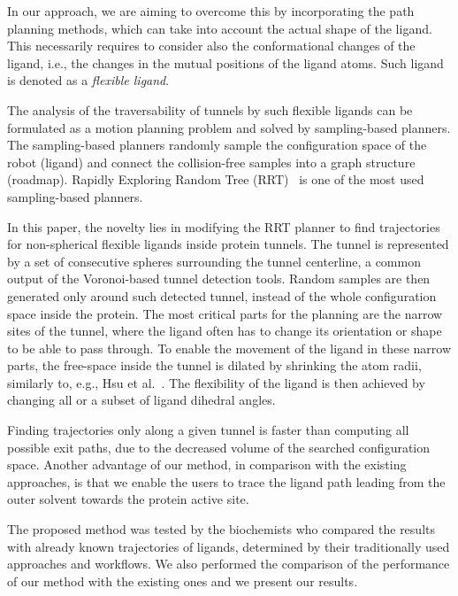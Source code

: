 \documentclass{bmcart}
\begin{document}
In our approach, we are aiming to overcome this by incorporating the path planning methods, which can take into account the actual shape of the ligand.
This necessarily requires to consider also the conformational changes of the ligand, i.e., the changes in the mutual positions of the ligand atoms.
Such ligand is denoted as a \textit{flexible ligand}.

The analysis of the traversability of tunnels by such flexible ligands can be formulated as a motion planning problem and solved by sampling-based planners.
The sampling-based planners randomly sample the configuration space of the robot (ligand) and connect the collision-free samples into a graph structure (roadmap).
Rapidly Exploring Random Tree (RRT)~\cite{lavalleRRT} is one of the most used sampling-based planners. 

In this paper, the novelty lies in modifying the RRT planner to find trajectories for non-spherical flexible ligands inside protein tunnels.
The tunnel is represented by a set of consecutive spheres surrounding the tunnel centerline, a common output of the Voronoi-based tunnel detection tools.
Random samples are then generated only around such detected tunnel, instead of the whole configuration space inside the protein.
The most critical parts for the planning are the narrow sites of the tunnel, where the ligand often has to change its orientation or shape to be able to pass through.
To enable the movement of the ligand in these narrow parts, the free-space inside the tunnel is dilated by shrinking the atom radii, similarly to, e.g., Hsu et al.~\cite{hsu06multilevel}.  %
The flexibility of the ligand is then achieved by changing all or a subset of ligand dihedral angles.

Finding trajectories only along a given tunnel is faster than computing all possible exit paths, due to the decreased volume of the searched configuration space.
Another advantage of our method, in comparison with the existing approaches, is that we enable the users to trace the ligand path leading from the outer solvent towards the protein active site.

The proposed method was tested by the biochemists who compared the results with already known trajectories of ligands, determined by their traditionally used approaches and workflows.
We also performed the comparison of the performance of our method with the existing ones and we present our results.
\end{document}
